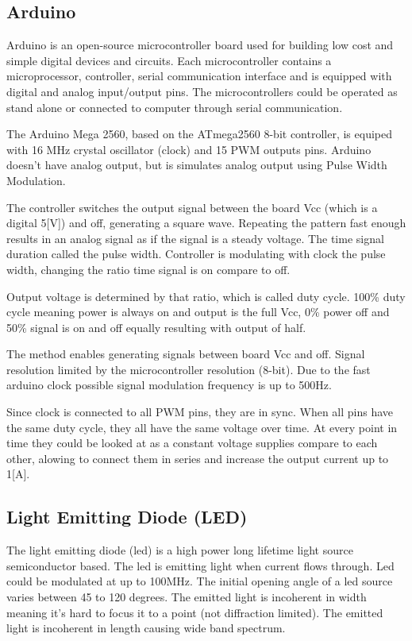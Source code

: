 \documentclass[\main/master.tex]{subfiles}
\begin{document}
\subsection{Arduino}
Arduino is an open-source microcontroller board used for building low cost and simple digital devices and circuits. Each microcontroller contains a microprocessor, controller, serial communication interface and is equipped with digital and analog input/output pins. The microcontrollers could be operated as stand alone or connected to computer through serial communication. 
\par\noindent
The Arduino Mega 2560, based on the ATmega2560 8-bit controller, is equiped with 16 MHz crystal oscillator (clock) and 15 PWM outputs pins. Arduino doesn't have analog output, but is simulates analog output using Pulse Width Modulation.
\par\noindent
The controller switches the output signal between the board Vcc (which is a digital 5[V]) and off, generating a square wave.
Repeating the pattern fast enough results in an analog signal as if the signal is a steady voltage. The time signal duration called the pulse width. Controller is modulating with clock the pulse width, changing the ratio time signal is on compare to off. 
\par\noindent
Output voltage is determined by that ratio, which is called duty cycle. 100\% duty cycle meaning power is always on and output is the full Vcc, 0\% power off and 50\% signal is on and off equally resulting with output of half. 
\par\noindent
The method enables generating signals between board Vcc and off. Signal resolution limited by the microcontroller resolution (8-bit). Due to the fast arduino clock possible signal modulation frequency is up to 500Hz.
\par\noindent
Since clock is connected to all PWM pins, they are in sync. When all pins have the same duty cycle, they all have the same voltage over time. At every point in time they could be looked at as a constant voltage supplies compare to each other, alowing to connect them in series and increase the output current up to 1[A]. 
\subsection{Light Emitting Diode (LED)}
The light emitting diode (led) is a high power long lifetime light source semiconductor based. The led is emitting light when current flows through. Led could be modulated at up to 100MHz. The initial opening angle of a led source varies between 45 to 120 degrees. The emitted light is incoherent in width meaning it's hard to focus it to a point (not diffraction limited). The emitted light is incoherent in length causing wide band spectrum.
\end{document}
